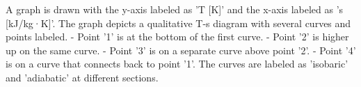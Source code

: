 A graph is drawn with the y-axis labeled as 'T [K]' and the x-axis labeled as 's [kJ/kg·K]'. The graph depicts a qualitative T-s diagram with several curves and points labeled.  
- Point '1' is at the bottom of the first curve.  
- Point '2' is higher up on the same curve.  
- Point '3' is on a separate curve above point '2'.  
- Point '4' is on a curve that connects back to point '1'.  
The curves are labeled as 'isobaric' and 'adiabatic' at different sections.